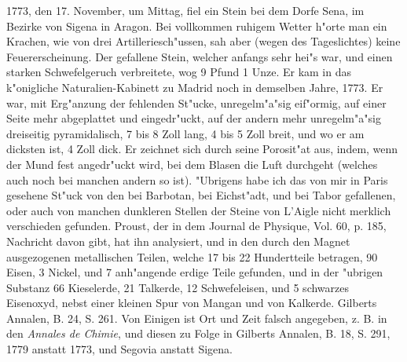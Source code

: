 \documentclass[a4paper, 11pt, oneside, polutonikogreek, german]{article}
\begin{document}
1773, den 17. November, um Mittag, fiel ein Stein bei dem Dorfe Sena, im Bezirke von Sigena in Aragon. Bei vollkommen ruhigem Wetter h"orte man ein Krachen, wie von drei Artilleriesch"ussen, sah aber (wegen des Tageslichtes) keine Feuererscheinung. Der gefallene Stein, welcher anfangs sehr hei"s war, und einen starken Schwefelgeruch verbreitete, wog 9 Pfund 1 Unze. Er kam in das k"onigliche Naturalien-Kabinett zu Madrid noch in demselben Jahre, 1773. Er war, mit Erg"anzung der fehlenden St"ucke, unregelm"a"sig eif"ormig, auf einer Seite mehr abgeplattet und eingedr"uckt, auf der andern mehr unregelm"a"sig dreiseitig pyramidalisch, 7 bis 8 Zoll lang, 4 bis 5 Zoll breit, und wo er am dicksten ist, 4 Zoll dick. Er zeichnet sich durch seine Porosit"at aus, indem, wenn der Mund fest angedr"uckt wird, bei dem Blasen die Luft durchgeht (welches auch noch bei manchen andern so ist). "Ubrigens habe ich das von mir in Paris gesehene St"uck von den bei Barbotan, bei Eichst"adt, und bei Tabor gefallenen, oder auch von manchen dunkleren Stellen der Steine von L'Aigle nicht merklich verschieden gefunden. Proust, der in dem Journal de Physique, Vol. 60, p. 185, Nachricht davon gibt, hat ihn analysiert, und in den durch den Magnet ausgezogenen metallischen Teilen, welche 17 bis 22 Hundertteile betragen, 90 Eisen, 3 Nickel, und 7 anh"angende erdige Teile gefunden, und in der "ubrigen Substanz 66 Kieselerde, 21 Talkerde, 12 Schwefeleisen, und 5 schwarzes Eisenoxyd, nebst einer kleinen Spur von Mangan und von Kalkerde. Gilberts Annalen, B. 24, S. 261. Von Einigen ist Ort und Zeit falsch angegeben, z. B. in den \emph{Annales de Chimie}, und diesen zu Folge in Gilberts Annalen, B. 18, S. 291, 1779 anstatt 1773, und Segovia anstatt Sigena.
\end{document}
